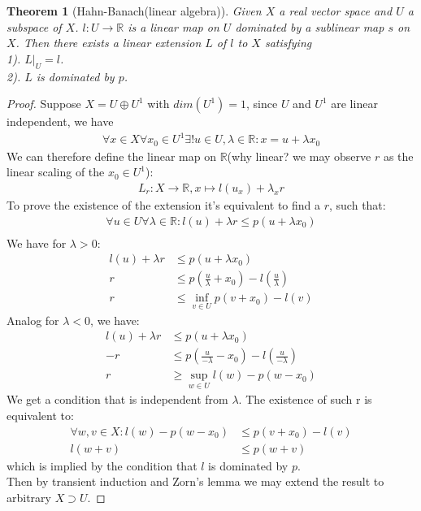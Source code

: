 \documentclass[a4paper,11pt,fleqn]{book}
\newtheorem{theorem}{Theorem}[section]
\theoremstyle{definition}
\theoremstyle{remark}
\begin{document}
\begin{theorem}[Hahn-Banach(linear algebra)]
	Given $X$ a real vector space and $U$ a subspace of $X$. $l: U \rightarrow \mathbb{R}$ is a linear map on $U$ dominated by a sublinear map $s$ on $X$. Then there exists a linear extension $L$ of $l$ to $X$ satisfying\\
	 1). $L|_U = l$.\\
	 2). $L$ is dominated by $p$.  
\end{theorem}
\begin{proof}
	Suppose $X = U \oplus U^1$ with $dim(U^1) = 1$, since $U$ and $U^1$ are linear independent, we have
	\begin{align*}
		\forall x \in X \forall x_0 \in U^1 \exists!u \in U, \lambda \in \mathbb{R} :
		 x = u + \lambda x_0
	\end{align*}
	We can therefore define the linear map on $\mathbb{R}$(why linear? we may observe $r$ as the linear scaling of the $x_0 \in U^1$):
	\begin{align*}
		L_r: X \rightarrow \mathbb{R}, x \mapsto l(u_x) + \lambda _xr
	\end{align*}
	To prove the existence of the extension it's equivalent to find a $r$, such that:
	\begin{align*}
		\forall u \in U \forall \lambda \in \mathbb{R} :
		 l(u) + \lambda r \leq p(u + \lambda x_0)\\
	\end{align*} 
	We have for $\lambda > 0$:
	\begin{align*}
		l(u) + \lambda r &\leq p(u + \lambda x_0)\\
		r &\leq p(\frac{u}{\lambda} + x_0)- l(\frac{u}{\lambda})\\
		r &\leq \inf_{v \in U}p(v + x_0) - l(v)
	\end{align*}
	Analog for $\lambda < 0$, we have:
	\begin{align*}
		l(u) + \lambda r &\leq p(u + \lambda x_0)\\
		-r &\leq p(\frac{u}{-\lambda} - x_0)- l(\frac{u}{-\lambda})\\
		r &\geq \sup_{w \in U}l(w) - p(w - x_0)  
	\end{align*}
	We get a condition that is independent from $\lambda$. The existence of such r is equivalent to:
	\begin{align*}
		\forall w, v \in X:  l(w) - p(w - x_0) &\leq p(v + x_0) - l(v) \\
		l(w + v ) &\leq p(w + v)
	\end{align*}
	which is implied by the condition that $l$ is dominated by $p$.\\
	Then by transient induction and Zorn's lemma we may extend the result to arbitrary $X \supset U $.
\end{proof}
\end{document}
